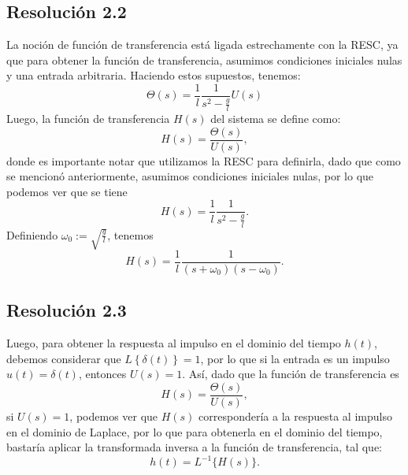 \documentclass[
  11pt,
  letterpaper,
   addpoints,
   answers
  ]{exam}
\begin{document}
\begin{questions}
\begin{solution}
\subsection*{Resolución 2.2}
La noción de función de transferencia está ligada estrechamente con la RESC, ya que para obtener la función de transferencia, asumimos condiciones iniciales nulas y una entrada arbitraria. Haciendo estos supuestos, tenemos:
\begin{equation}
\Theta(s) = \frac{1}{l} \frac{1}{s^2 - \frac{g}{l}} U(s)
\end{equation}
Luego, la función de transferencia \(H(s)\) del sistema se define como:
\begin{equation}
H(s) = \frac{\Theta(s)}{U(s)},
\end{equation}
donde es importante notar que utilizamos la RESC para definirla, dado que como se mencionó anteriormente, asumimos condiciones iniciales nulas, por lo que podemos ver que se tiene
\begin{equation}
H(s) = \frac{1}{l} \frac{1}{s^2 - \frac{g}{l}}.
\end{equation}
Definiendo \(\omega_0 := \sqrt{\frac{g}{l}}\), tenemos
\begin{equation}
H(s) = \frac{1}{l} \frac{1}{(s + \omega_0)(s - \omega_0)}.
\end{equation}

\subsection*{Resolución 2.3}
Luego, para obtener la respuesta al impulso en el dominio del tiempo \(h(t)\), debemos considerar que \(L\left\{ \delta(t) \right\} = 1\), por lo que si la entrada es un impulso \(u(t) = \delta(t)\), entonces \(U(s) = 1\). Así, dado que la función de transferencia es
\begin{equation}
H(s) = \frac{\Theta(s)}{U(s)},
\end{equation}
si \(U(s) = 1\), podemos ver que \(H(s)\) correspondería a la respuesta al impulso en el dominio de Laplace, por lo que para obtenerla en el dominio del tiempo, bastaría aplicar la transformada inversa a la función de transferencia, tal que:
\begin{equation}
h(t) = L^{-1}\{H(s)\}.
\end{equation}


\end{solution}
\end{questions}
\end{document}
